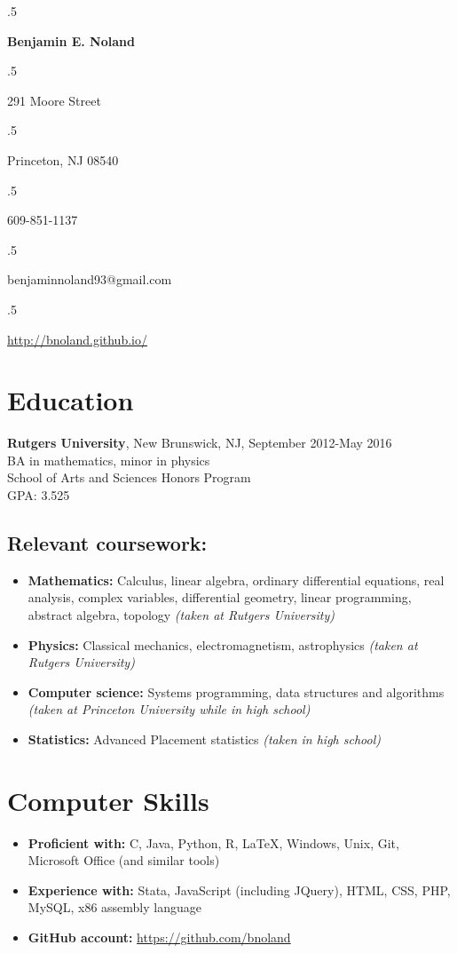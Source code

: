 \documentclass[12pt]{article}
\begin{document}
\moveleft.5\hoffset\centerline{\Large\bf Benjamin E. Noland}
\smallskip
\moveleft.5\hoffset\centerline{291 Moore Street}
\moveleft.5\hoffset\centerline{Princeton, NJ 08540}
\moveleft.5\hoffset\centerline{609-851-1137}
\moveleft.5\hoffset\centerline{benjaminnoland93@gmail.com}
\moveleft.5\hoffset\centerline{\url{http://bnoland.github.io/}}

\section*{Education}

\textbf{Rutgers University}, New Brunswick, NJ, September 2012-May 2016 \\
BA in mathematics, minor in physics \\
School of Arts and Sciences Honors Program \\
GPA: 3.525

\subsection*{Relevant coursework:}
\begin{itemize}
\item
\textbf{Mathematics:} Calculus, linear algebra, ordinary differential equations, real analysis, complex variables, differential geometry, linear programming, abstract algebra, topology \textit{(taken at Rutgers University)}

\item
\textbf{Physics:}
Classical mechanics, electromagnetism, astrophysics \textit{(taken at Rutgers University)}

\item
\textbf{Computer science:}
Systems programming, data structures and algorithms \textit{(taken at Princeton University while in high school)}

\item
\textbf{Statistics:} Advanced Placement statistics \textit{(taken in high school)}

\end{itemize}

\section*{Computer Skills}
\begin{itemize}
\item
\textbf{Proficient with:} C, Java, Python, R, \LaTeX, Windows, Unix, Git, Microsoft Office (and similar tools)
\item
\textbf{Experience with:} Stata, JavaScript (including JQuery), HTML, CSS, PHP, MySQL, x86 assembly language
\item
\textbf{GitHub account:} \url{https://github.com/bnoland}
\end{itemize}
\end{document}
